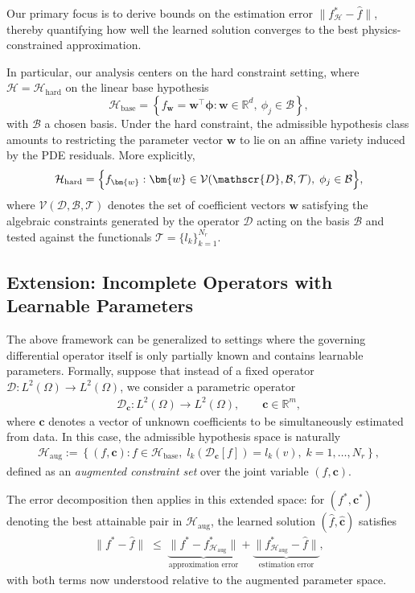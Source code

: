 \documentclass{article}
\theoremstyle{plain}
\theoremstyle{definition}
\theoremstyle{remark}
\begin{document}
Our primary focus is to derive bounds on the estimation error $\|f_{\mathcal{H}}^* - \hat{f}\|$,
thereby quantifying how well the learned solution converges to the best physics-constrained approximation.

In particular, our analysis centers on the hard constraint setting, where 
$\mathcal{H} = \mathcal{H}_{\text{hard}}$ on the linear base hypothesis
\[
   \mathcal{H}_{\text{base}} = 
   \left\{ f_{\bm{w}} = \bm{w}^{\top}\bm{\phi} :
      \bm{w} \in \mathbb{R}^{d},\ \phi_{j} \in \mathcal{B}\right\},
\]
with $\mathcal{B}$ a chosen basis.  
Under the hard constraint, the admissible hypothesis class amounts to restricting
the parameter vector $\bm{w}$ to lie on an affine variety induced by the PDE
residuals. More explicitly,
\[
   \mathcal{H}_{\text{hard}}
   = \Bigl\{ f_{\bm{w}} :
       \bm{w} \in \mathcal{V}(\mathscr{D},\mathcal{B},\mathcal{T}),\;
       \phi_{j}\in\mathcal{B}\Bigr\},
\]
where $\mathcal{V}(\mathscr{D},\mathcal{B},\mathcal{T})$ denotes the set of
coefficient vectors $\bm{w}$ satisfying the algebraic constraints generated by
the operator $\mathscr{D}$ acting on the basis $\mathcal{B}$ and tested against
the functionals $\mathcal{T}=\{l_{k}\}_{k=1}^{N_{r}}$.  


\subsection{Extension: Incomplete Operators with Learnable Parameters}
\label{app:extension}
The above framework can be generalized to settings where the governing
differential operator itself is only partially known and contains
learnable parameters.  
Formally, suppose that instead of a fixed operator
$\mathscr{D}:L^{2}(\Omega)\to L^{2}(\Omega)$,
we consider a parametric operator
\begin{align*}
   \mathscr{D}_{\bm{c}} : L^{2}(\Omega)\to L^{2}(\Omega), \qquad 
   \bm{c}\in\mathbb{R}^{m},
\end{align*}
where $\bm{c}$ denotes a vector of unknown coefficients to be
simultaneously estimated from data.  
In this case, the admissible hypothesis space is naturally
\begin{align*}
   \mathcal{H}_{\text{aug}}
   := \left\{ (f,\bm{c}) : f\in\mathcal{H}_{\text{base}},\;
        l_k\!\left(\mathscr{D}_{\bm{c}}[f]\right)=l_k(v),\;
        k=1,\dots,N_{r}\right\},
\end{align*}
defined as an \emph{augmented constraint set} over the joint variable
$(f,\bm{c})$.

The error decomposition then applies in this extended space:
for $(f^{\ast},\bm{c}^{\ast})$ denoting the best attainable pair in
$\mathcal{H}_{\text{aug}}$, the learned solution
$(\hat f,\hat{\bm{c}})$ satisfies
\begin{align*}
   \|f^{\ast}-\hat f\|
   \;\le\;
   \underbrace{\|f^{\ast}-f^{\ast}_{\mathcal{H}_{\text{aug}}}\|}_{\text{approximation error}}
   +\underbrace{\|f^{\ast}_{\mathcal{H}_{\text{aug}}}-\hat f\|}_{\text{estimation error}},
\end{align*}
with both terms now understood relative to the augmented parameter space.
\end{document}
